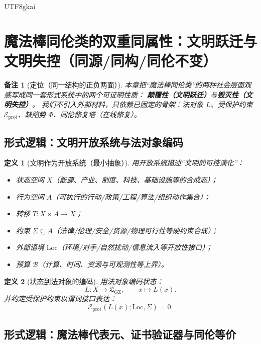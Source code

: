 \documentclass[12pt]{article}
\newtheorem{definition}{定义}[section]
\newtheorem{remark}{备注}[section]
\newcommand{\GZLS}{\ensuremath{\mathfrak{L}_{\mathrm{GZ}}}}
\begin{document}
\begin{CJK*}{UTF8}{gkai}
\clearpage

\section{魔法棒同伦类的双重同属性：文明跃迁与文明失控（同源/同构/同伦不变）}
\label{sec:magic-wand-homotopy-dual-properties}

\begin{remark}[定位（同一结构的正负两面）]
本章把“魔法棒同伦类”的两种社会层面观感写成同一套形式系统中的两个可证明性质：
\textbf{颠覆性（文明跃迁）}与\textbf{毁灭性（文明失控）}。
我们不引入外部材料，只依赖已固定的骨架：法对象 $L$、受保护约束 $\mathcal{E}_{\mathrm{prot}}$、缺陷势 $\Phi$、同伦修复塔（在线修复）。
\end{remark}

\subsection{形式逻辑：文明开放系统与法对象编码}
\label{sec:magic-wand-civilization-law-encoding}

\begin{definition}[文明作为开放系统（最小抽象）]
\label{def:civilization-open-system}
用开放系统描述“文明的可控演化”：
\begin{itemize}
  \item 状态空间 $X$（能源、产业、制度、科技、基础设施等的合成态）；
  \item 行为空间 $A$（可执行的行动/政策/工程/算法/组织动作集合）；
  \item 转移 $T:X\times A\to X$；
  \item 约束 $\Sigma\subseteq A$（法律/伦理/安全/资源/物理可行性等硬约束合成）；
  \item 外部语境 $\mathrm{Loc}$（环境/对手/自然扰动/信息流入等开放性接口）；
  \item 预算 $\mathcal{B}$（计算、时间、资源与可观测性等上界）。
\end{itemize}
\end{definition}

\begin{definition}[状态到法对象的编码]
\label{def:civilization-law-encoding}
用法对象编码状态：
\[
  L:X\to \GZLS,\qquad x\mapsto L(x).
\]
并约定受保护约束以谓词接口表达：
\[
  \mathcal{E}_{\mathrm{prot}}(L(x);\mathrm{Loc},\Sigma)=0.
\]
\end{definition}

\subsection{形式逻辑：魔法棒代表元、证书验证器与同伦等价}
\label{sec:magic-wand-representative-homotopy}


\end{CJK*}
\end{document}
